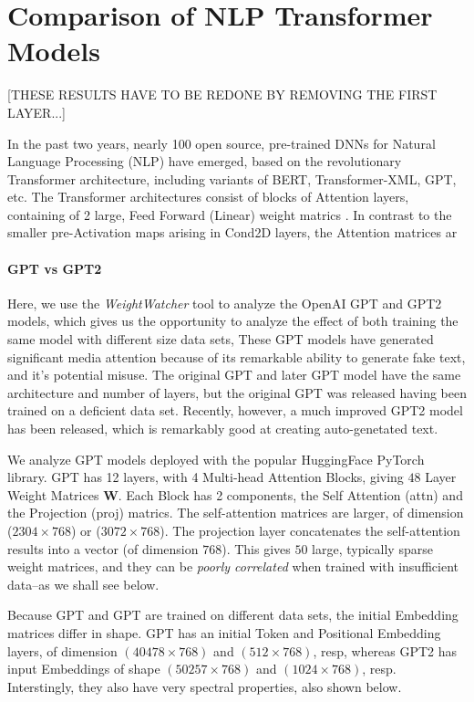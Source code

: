 \section{Comparison of NLP Transformer Models}
\label{sxn:nlp}

[THESE RESULTS HAVE TO BE REDONE BY REMOVING THE FIRST LAYER...]

In the past two years, nearly 100 open source, pre-trained DNNs for Natural Language Processing (NLP) have emerged,
based on the revolutionary Transformer architecture, including variants of BERT, Transformer-XML, GPT, etc.
The Transformer architectures consist of blocks of Attention layers, containing of 2 large, Feed Forward (Linear)
weight matrics \cite{Attn2017}. In contrast to the smaller pre-Activation maps arising in Cond2D layers,
the Attention matrices ar

\paragraph{GPT vs GPT2}
Here, we use the \emph{WeightWatcher} tool to analyze the OpenAI GPT and GPT2 models, which gives us
the opportunity to analyze the effect of both training the same model with different size data sets,
These GPT models have generated significant media attention because of its remarkable ability to
 generate fake text, and it's potential misuse. 
The original GPT and later GPT model have the same architecture and number of layers, but
the original GPT was released having been trained on a deficient data set.  Recently,
 however, a much improved GPT2 model has been released, which is remarkably good at creating 
auto-genetated text.  

We analyze GPT models deployed with the popular HuggingFace PyTorch library.
GPT has 12 layers, with 4 Multi-head Attention Blocks, giving $48$ Layer Weight Matrices $\mathbf{W}$.
Each Block has 2 components, the Self Attention (attn) and the Projection (proj) matrics.  
The self-attention  matrices are larger, of dimension ($2304\times 768$) or ($3072\times 768$).
The projection layer concatenates the self-attention results into a vector (of dimension $768$).
This gives $50$ large, typically sparse weight matrices, and they can be
 \emph{poorly correlated} when trained with insufficient data--as we shall see below.

Because GPT and GPT are trained on different data sets, the initial Embedding matrices differ in shape.
GPT  has an initial Token and Positional Embedding layers, of dimension
$(40478\times 768)$ and $(512\times 768)$, resp, whereas GPT2 has input Embeddings of shape
$(50257\times 768)$ and $(1024\times 768)$, resp.  Interstingly, they also have very spectral properties,
also shown below.

